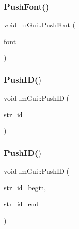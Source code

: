 \hypertarget{namespace_im_gui_ac5a59f4f8226fd35786d8973c85b85a9}{}\label{namespace_im_gui_ac5a59f4f8226fd35786d8973c85b85a9} 
\subsubsection{\texorpdfstring{Push\+Font()}{PushFont()}}
{\footnotesize\ttfamily void Im\+Gui\+::\+Push\+Font (\begin{DoxyParamCaption}\item[{\hyperlink{struct_im_font}{Im\+Font} $\ast$}]{font }\end{DoxyParamCaption})}

\hypertarget{namespace_im_gui_a27a8533605dc5b8cabf161bf7715bbde}{}\label{namespace_im_gui_a27a8533605dc5b8cabf161bf7715bbde} 
\subsubsection{\texorpdfstring{Push\+I\+D()}{PushID()}\hspace{0.1cm}{\footnotesize\ttfamily [1/4]}}
{\footnotesize\ttfamily void Im\+Gui\+::\+Push\+ID (\begin{DoxyParamCaption}\item[{const char $\ast$}]{str\+\_\+id }\end{DoxyParamCaption})}

\hypertarget{namespace_im_gui_af5e55788830807a7c53d5dd7865b692a}{}\label{namespace_im_gui_af5e55788830807a7c53d5dd7865b692a} 
\subsubsection{\texorpdfstring{Push\+I\+D()}{PushID()}\hspace{0.1cm}{\footnotesize\ttfamily [2/4]}}
{\footnotesize\ttfamily void Im\+Gui\+::\+Push\+ID (\begin{DoxyParamCaption}\item[{const char $\ast$}]{str\+\_\+id\+\_\+begin,  }\item[{const char $\ast$}]{str\+\_\+id\+\_\+end }\end{DoxyParamCaption})}

\hypertarget{namespace_im_gui_af9cf42fdf2fbc5eeec7521de14996bfb}{}\label{namespace_im_gui_af9cf42fdf2fbc5eeec7521de14996bfb} 
